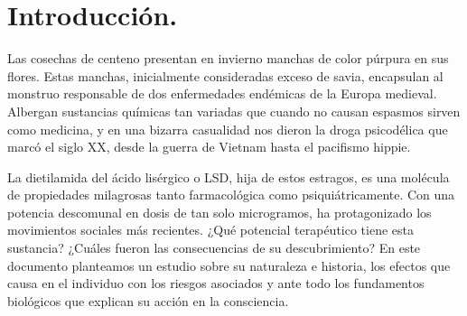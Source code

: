 \section{Introducción.}

Las cosechas de centeno presentan en invierno manchas de color púrpura en sus flores. Estas manchas, inicialmente consideradas exceso de savia, encapsulan al monstruo responsable de dos enfermedades endémicas de la Europa medieval. Albergan sustancias químicas tan variadas que cuando no causan espasmos sirven como medicina, y en una bizarra casualidad nos dieron la droga psicodélica que marcó el siglo XX, desde la guerra de Vietnam hasta el pacifismo hippie.

La dietilamida del ácido lisérgico o LSD, hija de estos estragos, es una molécula de propiedades milagrosas tanto farmacológica como psiquiátricamente. Con una potencia descomunal en dosis de tan solo microgramos, ha protagonizado los movimientos sociales más recientes. ¿Qué potencial terapéutico tiene esta sustancia? ¿Cuáles fueron las consecuencias de su descubrimiento? En este documento planteamos un estudio sobre su naturaleza e historia, los efectos que causa en el individuo con los riesgos asociados y ante todo los fundamentos biológicos que explican su acción en la consciencia.
